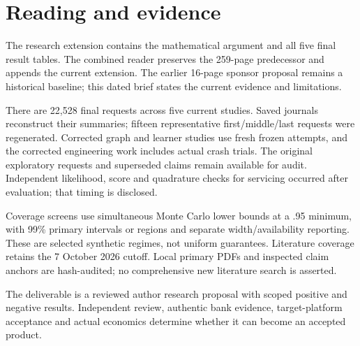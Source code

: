 \documentclass[11pt,a4paper]{article}
\begin{document}
\section*{Reading and evidence}
The research extension contains the mathematical argument and all five final result tables. The combined reader preserves the 259-page predecessor and appends the current extension. The earlier 16-page sponsor proposal remains a historical baseline; this dated brief states the current evidence and limitations.

There are 22,528 final requests across five current studies. Saved journals reconstruct their summaries; fifteen representative first/middle/last requests were regenerated. Corrected graph and learner studies use fresh frozen attempts, and the corrected engineering work includes actual crash trials. The original exploratory requests and superseded claims remain available for audit. Independent likelihood, score and quadrature checks for servicing occurred after evaluation; that timing is disclosed.

Coverage screens use simultaneous Monte Carlo lower bounds at a .95 minimum, with 99\% primary intervals or regions and separate width/availability reporting. These are selected synthetic regimes, not uniform guarantees. Literature coverage retains the 7 October 2026 cutoff. Local primary PDFs and inspected claim anchors are hash-audited; no comprehensive new literature search is asserted.

The deliverable is a reviewed author research proposal with scoped positive and negative results. Independent review, authentic bank evidence, target-platform acceptance and actual economics determine whether it can become an accepted product.
\end{document}
